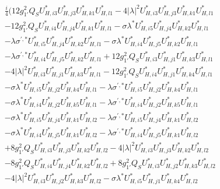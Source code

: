 \begin{align} 
 &\frac{i}{4} \Big(12 g_{1'}^{2} Q_{S} U^*_{{H},{i 3}} U^*_{{H},{j 3}} U^*_{{H},{k 1}} U^*_{{H},{l 1}} -4 |\lambda|^2 U^*_{{H},{i 3}} U^*_{{H},{j 3}} U^*_{{H},{k 1}} U^*_{{H},{l 1}} \nonumber \\ 
 &-12 g_{1'}^{2} Q_{S} U^*_{{H},{i 4}} U^*_{{H},{j 4}} U^*_{{H},{k 1}} U^*_{{H},{l 1}} - \sigma \lambda^* U^*_{{H},{i 5}} U^*_{{H},{j 4}} U^*_{{H},{k 2}} U^*_{{H},{l 1}} \nonumber \\ 
 &- \lambda \sigma^{\prime,*} U^*_{{H},{i 5}} U^*_{{H},{j 4}} U^*_{{H},{k 2}} U^*_{{H},{l 1}} - \sigma \lambda^* U^*_{{H},{i 4}} U^*_{{H},{j 5}} U^*_{{H},{k 2}} U^*_{{H},{l 1}} \nonumber \\ 
 &- \lambda \sigma^{\prime,*} U^*_{{H},{i 4}} U^*_{{H},{j 5}} U^*_{{H},{k 2}} U^*_{{H},{l 1}} +12 g_{1'}^{2} Q_{S} U^*_{{H},{i 3}} U^*_{{H},{j 1}} U^*_{{H},{k 3}} U^*_{{H},{l 1}} \nonumber \\ 
 &-4 |\lambda|^2 U^*_{{H},{i 3}} U^*_{{H},{j 1}} U^*_{{H},{k 3}} U^*_{{H},{l 1}} -12 g_{1'}^{2} Q_{S} U^*_{{H},{i 4}} U^*_{{H},{j 1}} U^*_{{H},{k 4}} U^*_{{H},{l 1}} \nonumber \\ 
 &- \sigma \lambda^* U^*_{{H},{i 5}} U^*_{{H},{j 2}} U^*_{{H},{k 4}} U^*_{{H},{l 1}} - \lambda \sigma^{\prime,*} U^*_{{H},{i 5}} U^*_{{H},{j 2}} U^*_{{H},{k 4}} U^*_{{H},{l 1}} \nonumber \\ 
 &- \sigma \lambda^* U^*_{{H},{i 4}} U^*_{{H},{j 2}} U^*_{{H},{k 5}} U^*_{{H},{l 1}} - \lambda \sigma^{\prime,*} U^*_{{H},{i 4}} U^*_{{H},{j 2}} U^*_{{H},{k 5}} U^*_{{H},{l 1}} \nonumber \\ 
 &- \sigma \lambda^* U^*_{{H},{i 5}} U^*_{{H},{j 4}} U^*_{{H},{k 1}} U^*_{{H},{l 2}} - \lambda \sigma^{\prime,*} U^*_{{H},{i 5}} U^*_{{H},{j 4}} U^*_{{H},{k 1}} U^*_{{H},{l 2}} \nonumber \\ 
 &- \sigma \lambda^* U^*_{{H},{i 4}} U^*_{{H},{j 5}} U^*_{{H},{k 1}} U^*_{{H},{l 2}} - \lambda \sigma^{\prime,*} U^*_{{H},{i 4}} U^*_{{H},{j 5}} U^*_{{H},{k 1}} U^*_{{H},{l 2}} \nonumber \\ 
 &+8 g_{1'}^{2} Q_{S} U^*_{{H},{i 3}} U^*_{{H},{j 3}} U^*_{{H},{k 2}} U^*_{{H},{l 2}} -4 |\lambda|^2 U^*_{{H},{i 3}} U^*_{{H},{j 3}} U^*_{{H},{k 2}} U^*_{{H},{l 2}} \nonumber \\ 
 &-8 g_{1'}^{2} Q_{S} U^*_{{H},{i 4}} U^*_{{H},{j 4}} U^*_{{H},{k 2}} U^*_{{H},{l 2}} +8 g_{1'}^{2} Q_{S} U^*_{{H},{i 3}} U^*_{{H},{j 2}} U^*_{{H},{k 3}} U^*_{{H},{l 2}} \nonumber \\ 
 &-4 |\lambda|^2 U^*_{{H},{i 3}} U^*_{{H},{j 2}} U^*_{{H},{k 3}} U^*_{{H},{l 2}} - \sigma \lambda^* U^*_{{H},{i 5}} U^*_{{H},{j 1}} U^*_{{H},{k 4}} U^*_{{H},{l 2}} \nonumber \\ 

\end{align}
